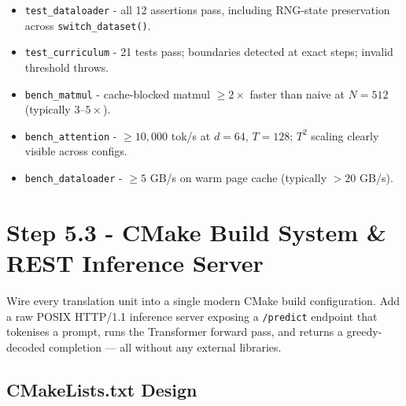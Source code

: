 \documentclass[12pt, a4paper]{article}
\begin{document}
\begin{tcolorbox}[exitbox, title={Step 5.2 - Exit Criterion (met)}]
  \begin{itemize}
    \item \texttt{test\_dataloader} - all 12 assertions pass, including
          RNG-state preservation across \texttt{switch\_dataset()}. \checkmark
    \item \texttt{test\_curriculum} - 21 tests pass; boundaries detected
          at exact steps; invalid threshold throws. \checkmark
    \item \texttt{bench\_matmul} - cache-blocked matmul $\geq 2\times$ faster
          than naive at $N=512$ (typically $3$--$5\times$). \checkmark
    \item \texttt{bench\_attention} - $\geq 10{,}000$ tok/s at $d=64$, $T=128$;
          $T^2$ scaling clearly visible across configs. \checkmark
    \item \texttt{bench\_dataloader} - $\geq 5$ GB/s on warm page cache
          (typically $>20$ GB/s). \checkmark
  \end{itemize}
\end{tcolorbox}

\section{Step 5.3 - CMake Build System \& REST Inference Server}

\begin{tcolorbox}[designbox, title={Step 5.3 Goal --- The Final Assembly}]
  Wire every translation unit into a single modern CMake build configuration.
  Add a raw POSIX HTTP/1.1 inference server exposing a \texttt{/predict}
  endpoint that tokenises a prompt, runs the Transformer forward pass, and
  returns a greedy-decoded completion --- all without any external libraries.
\end{tcolorbox}

\subsection{CMakeLists.txt Design}
\end{document}
